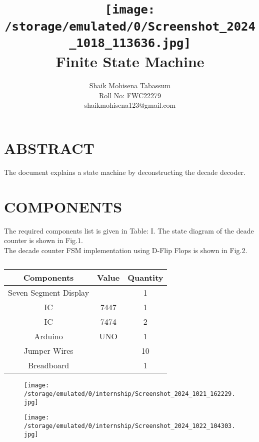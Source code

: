 \documentclass[conference]{IEEEtran}
\title{
\vspace{1cm}
{\texttt{[image: /storage/emulated/0/Screenshot\_2024\_1018\_113636.jpg]} \\ Finite State Machine} }
\author{Shaik Mohisena Tabassum \\ Roll No: FWC22279 \\ shaikmohisena123@gmail.com}
\begin{document}
\maketitle
 \section {ABSTRACT}
 The document explains a state machine by deconstructing the decade decoder.
\section{COMPONENTS}
The required components list is given in Table: I. The state diagram of the deade counter is shown in Fig.1. \\
 The decade counter FSM implementation using D-Flip Flops is shown in Fig.2. 
 \begin{table} [htbp]
\centering
\begin{tabular}{| c | c | c |} \hline
\textbf{Components} & \textbf{Value} & \textbf{Quantity} \\\hline
Seven Segment Display & & 1 \\ \hline
IC & 7447 & 1 \\ \hline 
IC & 7474 & 2 \\ \hline
Arduino & UNO & 1 \\ \hline
Jumper Wires &  & 10 \\ \hline
Breadboard & & 1 \\ 
\hline
\end{tabular}
\vspace{0.1cm}
\caption{\label{tab:widgets}}
\end{table}

\begin{figure}[h]
\centering
\texttt{[image: /storage/emulated/0/internship/Screenshot\_2024\_1021\_162229.jpg]}
\caption{\label{fig:Gates}}
\end{figure}



\begin{figure}[h]
\centering
\texttt{[image: /storage/emulated/0/internship/Screenshot\_2024\_1022\_104303.jpg]}
\caption{\label{fig:Gates}}
\end{figure}
\end{document}
